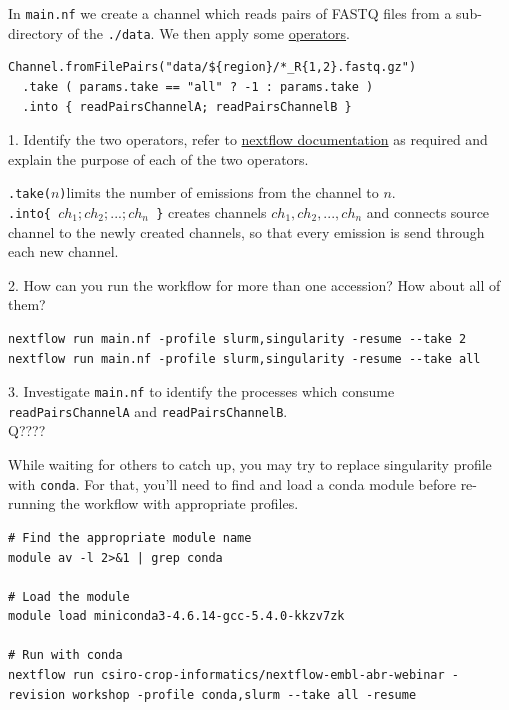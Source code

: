 \begin{questions}
In \texttt{main.nf} we create a channel which reads pairs of FASTQ files from a sub-directory of the \texttt{./data}. We then apply some \href{https://www.nextflow.io/docs/latest/operator.html}{operators}. 
\begin{verbatim}
Channel.fromFilePairs("data/${region}/*_R{1,2}.fastq.gz")
  .take ( params.take == "all" ? -1 : params.take ) 
  .into { readPairsChannelA; readPairsChannelB } 
\end{verbatim}
1. Identify the two operators, refer to \href{https://www.nextflow.io/docs/latest/operator.html}{nextflow documentation} as required and explain the purpose of each of the two operators.\\
\begin{answer}
\texttt{.take($n$)}limits the number of emissions from the channel to $n$. \\
\texttt{.into\{ $ch_1;ch_2;...;ch_n$ \}} creates channels $ch_1,ch_2,...,ch_n$ and connects source channel to the newly created channels, so that every emission is send through each new channel.
\end{answer}

2. How can you run the workflow for more than one accession? How about all of them?
\begin{answer}
\begin{lstlisting}
nextflow run main.nf -profile slurm,singularity -resume --take 2
nextflow run main.nf -profile slurm,singularity -resume --take all
\end{lstlisting}
\end{answer}

3. Investigate \texttt{main.nf} to identify the processes which consume \texttt{readPairsChannelA} and \texttt{readPairsChannelB}. \\

Q????

\end{questions}


\begin{bonus}
While waiting for others to catch up, you may try to replace singularity profile with \texttt{conda}.
For that, you'll need to find and load a conda module before re-running the workflow with appropriate profiles.
\begin{answer}

\begin{lstlisting}
# Find the appropriate module name
module av -l 2>&1 | grep conda

# Load the module
module load miniconda3-4.6.14-gcc-5.4.0-kkzv7zk

# Run with conda
nextflow run csiro-crop-informatics/nextflow-embl-abr-webinar -revision workshop -profile conda,slurm --take all -resume

\end{lstlisting}
\end{answer}
\end{bonus}


